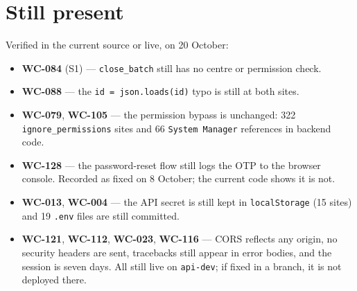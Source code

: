 \documentclass[11pt]{article}
\newcommand{\wc}[1]{\mbox{WC-#1}}
\begin{document}
\section{Still present}
Verified in the current source or live, on 20 October:
\begin{itemize}
  \item \textbf{\wc{084}} (S1) --- \texttt{close\_batch} still has no centre or permission check.
  \item \textbf{\wc{088}} --- the \texttt{id = json.loads(id)} typo is still at both sites.
  \item \textbf{\wc{079}}, \textbf{\wc{105}} --- the permission bypass is unchanged: 322
        \texttt{ignore\_permissions} sites and 66 \texttt{System~Manager} references in backend code.
  \item \textbf{\wc{128}} --- the password-reset flow still logs the OTP to the browser console.
        Recorded as fixed on 8 October; the current code shows it is not.
  \item \textbf{\wc{013}}, \textbf{\wc{004}} --- the API secret is still kept in \texttt{localStorage}
        (15 sites) and 19 \texttt{.env} files are still committed.
  \item \textbf{\wc{121}}, \textbf{\wc{112}}, \textbf{\wc{023}}, \textbf{\wc{116}} --- CORS reflects
        any origin, no security headers are sent, tracebacks still appear in error bodies, and the
        session is seven days. All still live on \texttt{api-dev}; if fixed in a branch, it is not
        deployed there.
\end{itemize}
\end{document}
